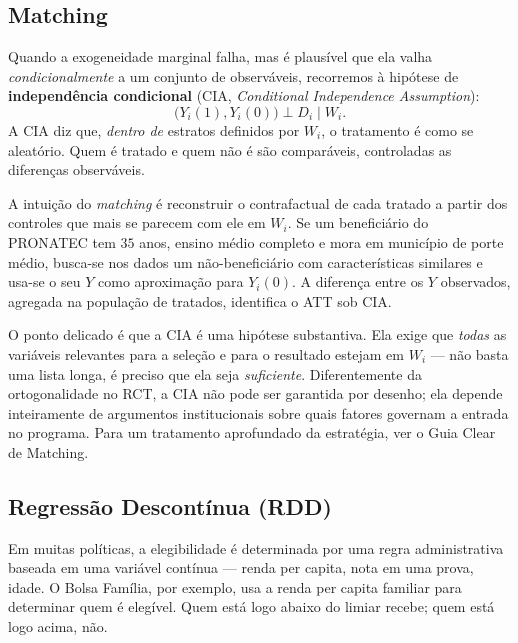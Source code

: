 \subsection{Matching}
\label{subsubsec:matching}

Quando a exogeneidade marginal falha, mas é plausível que ela valha \textit{condicionalmente} a um conjunto de observáveis, recorremos à hipótese de \textbf{independência condicional} (CIA, \textit{Conditional Independence Assumption}):
\begin{equation}
\big(Y_i(1), Y_i(0)\big) \perp D_i \mid W_i.
\label{eq:cia}
\end{equation}
A CIA diz que, \textit{dentro de} estratos definidos por $W_i$, o tratamento é como se aleatório. Quem é tratado e quem não é são comparáveis, controladas as diferenças observáveis.

A intuição do \textit{matching} é reconstruir o contrafactual de cada tratado a partir dos controles que mais se parecem com ele em $W_i$. Se um beneficiário do PRONATEC tem $35$ anos, ensino médio completo e mora em município de porte médio, busca-se nos dados um não-beneficiário com características similares e usa-se o seu $Y$ como aproximação para $Y_i(0)$. A diferença entre os $Y$ observados, agregada na população de tratados, identifica o ATT sob CIA.

O ponto delicado é que a CIA é uma hipótese substantiva. Ela exige que \textit{todas} as variáveis relevantes para a seleção e para o resultado estejam em $W_i$ --- não basta uma lista longa, é preciso que ela seja \textit{suficiente}. Diferentemente da ortogonalidade no RCT, a CIA não pode ser garantida por desenho; ela depende inteiramente de argumentos institucionais sobre quais fatores governam a entrada no programa. Para um tratamento aprofundado da estratégia, ver o Guia Clear de Matching.

\subsection{Regressão Descontínua (RDD)}
\label{subsubsec:rdd}

Em muitas políticas, a elegibilidade é determinada por uma regra administrativa baseada em uma variável contínua --- renda per capita, nota em uma prova, idade. O Bolsa Família, por exemplo, usa a renda per capita familiar para determinar quem é elegível. Quem está logo abaixo do limiar recebe; quem está logo acima, não.

